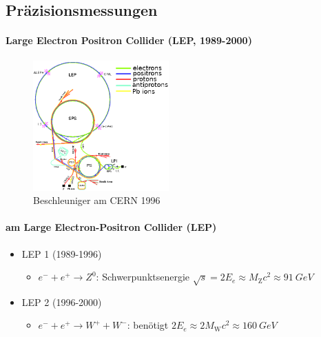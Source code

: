 \subsection{Präzisionsmessungen}
\begin{iframe} %
	\framesubtitle{Large Electron Positron Collider (LEP, 1989-2000)}
	\begin{figure}
		\includegraphics[height=5cm]{img/lep}
		\caption*{Beschleuniger am CERN 1996 \cite{lepacc}}
	\end{figure}
\end{iframe}

\begin{iframe}
	\framesubtitle{am Large Electron-Positron Collider (LEP)}
		\begin{itemize}
			\item LEP 1 (1989-1996)
		\begin{itemize}
			\item $e^-  + e^+ \rightarrow Z^0$: Schwerpunktsenergie $\sqrt{s} = 2E_e \approx M_\text{Z}c^2 \approx \SI{91}{GeV}$
		\end{itemize}
		\item LEP 2 (1996-2000)
		\begin{itemize}
			\item $e^- + e^+ \rightarrow W^+ + W^-$: benötigt $2E_e \approx 2M_\text{W}c^2 \approx \SI{160}{GeV}$ %
		\end{itemize}
		\end{itemize}
\end{iframe}

